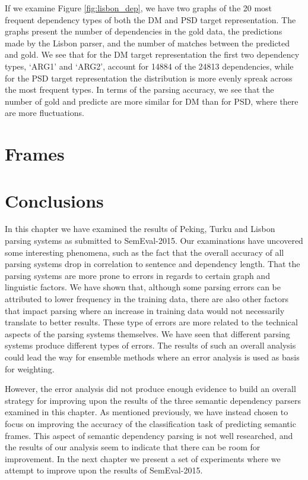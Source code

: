 If we examine Figure \ref{fig:lisbon_dep}, we have two graphs of the 20 most frequent dependency types of both the DM and PSD target representation. The graphs present the number of dependencies in the gold data, the predictions made by the Lisbon parser, and the number of matches between the predicted and gold. We see that for the DM target representation the first two dependency types, `ARG1' and `ARG2', account for 14884 of the 24813 dependencies, while for the PSD target representation the distribution is more evenly spreak across the most frequent types. In terms of the parsing accuracy, we see that the number of gold and predicte are more similar for DM than for PSD, where there are more fluctuations.



\section{Frames}

\section{Conclusions}

In this chapter we have examined the results of Peking, Turku and Lisbon parsing systems as submitted to SemEval-2015. Our examinations have uncovered some interesting phenomena, such as the fact that the overall accuracy of all parsing systems drop in correlation to sentence and dependency length. That the parsing systems are more prone to errors in regards to certain graph and linguistic factors. We have shown that, although some parsing errors can be attributed to lower frequency in the training data, there are also other factors that impact parsing where an increase in training data would not necessarily translate to better results. These type of errors are more related to the technical aspects of the parsing systems themselves. We have seen that different parsing systems produce different types of errors. The results of such an overall analysis could lead the way for ensemble methods where an error analysis is used as basis for weighting.

However, the error analysis did not produce enough evidence to build an overall strategy for improving upon the results of the three semantic dependency parsers examined in this chapter. As mentioned previously, we have instead chosen to focus on improving the accuracy of the classification task of predicting semantic frames. This aspect of semantic dependency parsing is not well researched, and the results of our analysis seem to indicate that there can be room for improvement. In the next chapter we present a set of experiments where we attempt to improve upon the results of SemEval-2015.

